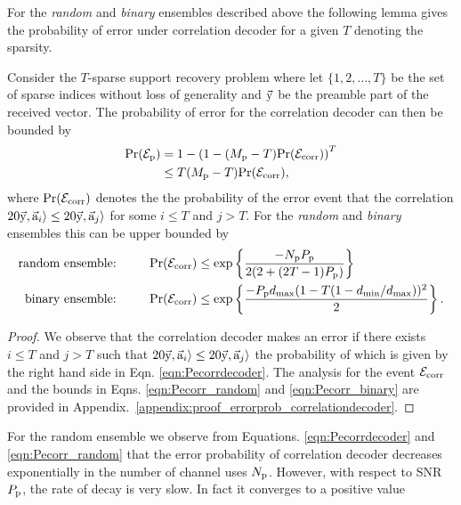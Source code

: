 For the \emph{random} and \emph{binary} ensembles described above the following lemma gives the probability of error under correlation decoder for a given $T$ denoting the sparsity.
\begin{lemma}
\label{lem:errorprob_correlationdecoder}
Consider the $T$-sparse support recovery problem where let $\{1,2,\ldots,T\}$ be the set of sparse indices without loss of generality and $\vec{\mathrm{y}}$ be the preamble part of the received vector. The probability of error for the correlation decoder  %
can then be bounded by
\begin{align}
\Pr(\mc{E}_{\mathrm{p}})&=1-\left(1-(\Mp-T)\Pr(\mc{E}_{\text{corr}})\right)^T \label{eqn:Pecorrdecoder}\\
&\leq T(\Mp-T)\Pr(\mc{E}_{\text{corr}})\notag,%
\end{align}
where $\mathrm{Pr}(\mathcal{E}_{\text{corr}})$ denotes the the probability of the error event that the correlation $20 \vec{\mathrm{y}}, \vec{\mathrm{a}}_i\rangle \leq 20 \vec{\mathrm{y}}, \vec{\mathrm{a}}_j\rangle $ for some $i\leq T$ and $j>T$. For the \emph{random} and \emph{binary} ensembles this can be upper bounded by 
\begin{align}
\text{random ensemble:}\qquad ~~&\mathrm{Pr}(\mathcal{E}_{\text{corr}})\leq \exp\left\lbrace\frac{-N_{\mathrm{p}}P_{\mathrm{p}}}{2(2+(2T-1)P_{\mathrm{p}})}\right\rbrace\label{eqn:Pecorr_random}\\
\text{binary ensemble:}\qquad ~~&\mathrm{Pr}(\mathcal{E}_{\text{corr}})\leq \exp\left\lbrace\frac{-P_{\mathrm{p}}d_{\mathrm{max}} (1-T(1-d_{\mathrm{min}}/d_{\mathrm{max}}))^2}{2}\right\rbrace.\label{eqn:Pecorr_binary}
\end{align}
\end{lemma}
\begin{proof}
We observe that the correlation decoder makes an error if there exists $i\leq T$ and $j>T$ such that $20 \vec{\mathrm{y}}, \vec{\mathrm{a}}_i\rangle \leq20 \vec{\mathrm{y}}, \vec{\mathrm{a}}_j\rangle $ the probability of which is given by the right hand side in Eqn. \eqref{eqn:Pecorrdecoder}. The analysis for the event $\mathcal{E}_{\text{corr}}$ and the bounds in Eqns. \eqref{eqn:Pecorr_random} and \eqref{eqn:Pecorr_binary} are provided in Appendix.~\ref{appendix:proof_errorprob_correlationdecoder}. 
\end{proof}
 For the random ensemble we observe from Equations. \eqref{eqn:Pecorrdecoder} and \eqref{eqn:Pecorr_random} that the error probability of correlation decoder decreases exponentially in the number of channel uses $N_{\mathrm{p}}$. However, with respect to SNR $P_{\mathrm{p}}$, the rate of decay is very slow. In fact it converges to a positive value

